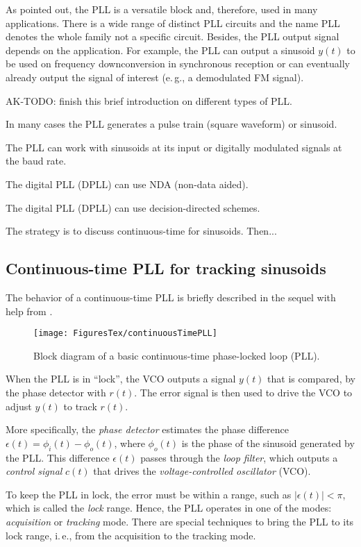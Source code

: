 As pointed out, the PLL is a versatile block and, therefore, used in many applications. 
There is a wide range of distinct PLL circuits and the name PLL denotes the whole family not
a specific circuit. Besides, the PLL output signal depends on the application. For example, the PLL can output a sinusoid $y(t)$ to be used on frequency downconversion in synchronous reception or can eventually already output the signal of interest (e.\,g., a demodulated FM signal). 

AK-TODO: finish this brief introduction on different types of PLL.

In many cases the PLL generates a pulse train (square waveform) or sinusoid.

The PLL can work with sinusoids at its input or digitally modulated signals at the baud rate.

The digital PLL (DPLL) can use NDA (non-data aided).

The digital PLL (DPLL) can use decision-directed schemes.

The strategy is to discuss continuous-time for sinusoids. Then...

\subsection{Continuous-time PLL for tracking sinusoids}

The behavior of a continuous-time PLL is briefly described in the sequel with help from .

\begin{figure}[htbp]
	\centering
		\texttt{[image: FiguresTex/continuousTimePLL]}		
	\caption{Block diagram of a basic continuous-time phase-locked loop (PLL).\label{fig:continuousTimePLL}}
\end{figure}

When the PLL is in ``lock'', the VCO outputs a signal $y(t)$ that is compared, by the phase detector with $r(t)$. The error signal is then used to drive the VCO to adjust $y(t)$ to track $r(t)$. 

More specifically, the \emph{phase detector} estimates the phase difference $\epsilon(t) = \phi_i(t)-\phi_o(t)$, where $\phi_o(t)$ is the phase of the sinusoid generated by the PLL. This difference $\epsilon(t)$ passes through the \emph{loop filter}, which outputs a \emph{control signal} $c(t)$ that drives the \emph{voltage-controlled oscillator} (VCO).

To keep the PLL in lock, the error must be within a range, such as $|\epsilon(t)| < \pi$, which is called the \emph{lock} range. Hence, the PLL operates in one of the modes: \emph{acquisition} or \emph{tracking} mode. There are special techniques to bring the PLL to its lock range, i.\,e., from the acquisition to the tracking mode.


